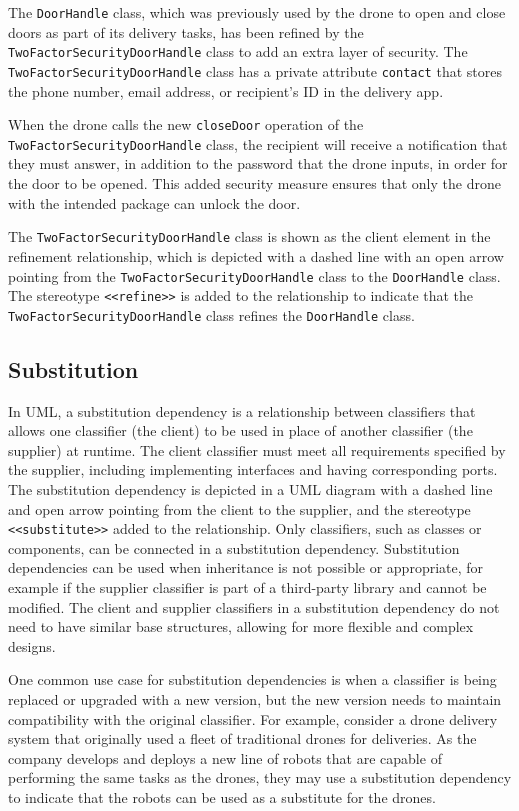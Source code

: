 \documentclass[
	12pt,
    a4paper,
    egregdoesnotlikesansseriftitles, %
    toc=chapterentrywithdots,
    oneside, openany,
    titlepage,
    parskip=half,
    headings=normal,  %
    listof=totoc,
    bibliography=totoc,
    index=totoc,
    captions=tableheading,  %
    listof=flat,
    numbers=noenddot, %
    final]
    {scrbook}
\begin{document}
The \texttt{DoorHandle} class, which was previously used by the drone to open and close doors as part of its delivery tasks, has been refined by the \texttt{TwoFactorSecurityDoorHandle} class to add an extra layer of security. The \texttt{TwoFactorSecurityDoorHandle} class has a private attribute \texttt{contact} that stores the phone number, email address, or recipient's ID in the delivery app.

When the drone calls the new \texttt{closeDoor} operation of the \texttt{TwoFactorSecurityDoorHandle} class, the recipient will receive a notification that they must answer, in addition to the password that the drone inputs, in order for the door to be opened. This added security measure ensures that only the drone with the intended package can unlock the door.

The \texttt{TwoFactorSecurityDoorHandle} class is shown as the client element in the refinement relationship, which is depicted with a dashed line with an open arrow pointing from the \texttt{TwoFactorSecurityDoorHandle} class to the \texttt{DoorHandle} class. The stereotype \texttt{<<refine>>} is added to the relationship to indicate that the \texttt{TwoFactorSecurityDoorHandle} class refines the \texttt{DoorHandle} class.


\subsection{Substitution}
In UML, a substitution dependency is a relationship between classifiers that allows one classifier (the client) to be used in place of another classifier (the supplier) at runtime.
The client classifier must meet all requirements specified by the supplier, including implementing interfaces and having corresponding ports. 
The substitution dependency is depicted in a UML diagram with a dashed line and open arrow pointing from the client to the supplier, and the stereotype \texttt{<<substitute>>} added to the relationship. 
Only classifiers, such as classes or components, can be connected in a substitution dependency. 
Substitution dependencies can be used when inheritance is not possible or appropriate, for example if the supplier classifier is part of a third-party library and cannot be modified. 
The client and supplier classifiers in a substitution dependency do not need to have similar base structures, allowing for more flexible and complex designs. \cite[p. 165]{uml}


One common use case for substitution dependencies is when a classifier is being replaced or upgraded with a new version, but the new version needs to maintain compatibility with the original classifier. For example, consider a drone delivery system that originally used a fleet of traditional drones for deliveries. As the company develops and deploys a new line of robots that are capable of performing the same tasks as the drones, they may use a substitution dependency to indicate that the robots can be used as a substitute for the drones.
\end{document}
